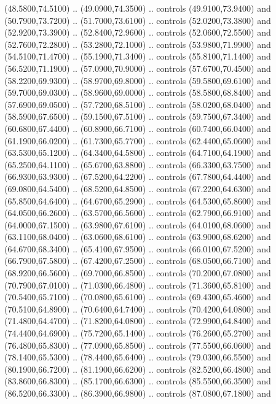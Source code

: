 {\begin{scope}[y=0.80pt, x=0.80pt, yscale=-1, xscale=1, inner sep=0pt, outer sep=0pt, #1]
      (48.5800,74.5100) .. (49.0900,74.3500) .. controls (49.9100,73.9400) and
      (50.7900,73.7200) .. (51.7000,73.6100) .. controls (52.0200,73.3800) and
      (52.9200,73.3900) .. (52.8400,72.9600) .. controls (52.0600,72.5500) and
      (52.7600,72.2800) .. (53.2800,72.1000) .. controls (53.9800,71.9900) and
      (54.5100,71.4700) .. (55.1900,71.3400) .. controls (55.8100,71.1400) and
      (56.5200,71.1900) .. (57.0900,70.9000) .. controls (57.6700,70.4500) and
      (58.2200,69.9300) .. (58.9700,69.8000) .. controls (59.5800,69.6100) and
      (59.7000,69.0300) .. (58.9600,69.0000) .. controls (58.5800,68.8400) and
      (57.6900,69.0500) .. (57.7200,68.5100) .. controls (58.0200,68.0400) and
      (58.5900,67.6500) .. (59.1500,67.5100) .. controls (59.7500,67.3400) and
      (60.6800,67.4400) .. (60.8900,66.7100) .. controls (60.7400,66.0400) and
      (61.1900,66.0200) .. (61.7300,65.7700) .. controls (62.4400,65.0600) and
      (63.5300,65.1200) .. (64.3400,64.5800) .. controls (64.7100,64.1900) and
      (65.2500,64.1100) .. (65.6700,63.8800) .. controls (66.3300,63.7500) and
      (66.9300,63.9300) .. (67.5200,64.2200) .. controls (67.7800,64.4400) and
      (69.0800,64.5400) .. (68.5200,64.8500) .. controls (67.2200,64.6300) and
      (65.8500,64.6400) .. (64.6700,65.2900) .. controls (64.5300,65.8600) and
      (64.0500,66.2600) .. (63.5700,66.5600) .. controls (62.7900,66.9100) and
      (64.0000,67.1500) .. (63.9800,67.6100) .. controls (64.0100,68.0600) and
      (63.1100,68.0400) .. (63.0600,68.6100) .. controls (63.9000,68.6200) and
      (64.6700,68.3400) .. (65.4100,67.9500) .. controls (66.0100,67.5200) and
      (66.7900,67.5800) .. (67.4200,67.2500) .. controls (68.0500,66.7100) and
      (68.9200,66.5600) .. (69.7000,66.8500) .. controls (70.2000,67.0800) and
      (70.7900,67.0100) .. (71.0300,66.4800) .. controls (71.3600,65.8100) and
      (70.5400,65.7100) .. (70.0800,65.6100) .. controls (69.4300,65.4600) and
      (70.5100,64.8900) .. (70.6400,64.7400) .. controls (70.4200,64.0800) and
      (71.4800,64.4700) .. (71.8200,64.0800) .. controls (72.9900,64.8400) and
      (74.4400,64.6900) .. (75.7200,65.1400) .. controls (76.2600,65.2700) and
      (76.4800,65.8300) .. (77.0900,65.8500) .. controls (77.5500,66.0600) and
      (78.1400,65.5300) .. (78.4400,65.6400) .. controls (79.0300,66.5500) and
      (80.1900,66.7200) .. (81.1900,66.6200) .. controls (82.5200,66.4800) and
      (83.8600,66.8300) .. (85.1700,66.6300) .. controls (85.5500,66.3500) and
      (86.5200,66.3300) .. (86.3900,66.9800) .. controls (87.0800,67.1800) and

\end{scope}}
